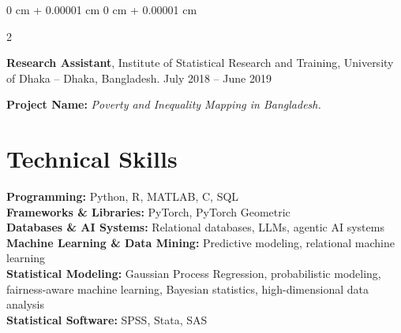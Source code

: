 \documentclass[10pt, letterpaper]{article}
\newenvironment{highlights}{
    \begin{itemize}[
        topsep=0.10 cm,
        parsep=0.10 cm,
        partopsep=0pt,
        itemsep=0pt,
        leftmargin=0 cm + 10pt
    ]
}{
    \end{itemize}
} %
\newenvironment{onecolentry}{
    \begin{adjustwidth}{
        0 cm + 0.00001 cm
    }{
        0 cm + 0.00001 cm
    }
}{
    \end{adjustwidth}
} %
\newenvironment{twocolentry}[2][]{
    \onecolentry
    \def\secondColumn{#2}
    \setcolumnwidth{\fill, 4.5 cm}
    \begin{paracol}{2}
}{
    \switchcolumn \raggedleft \secondColumn
    \end{paracol}
    \endonecolentry
} %
\begin{document}
    \begin{twocolentry}{
            July 2018 -- June 2019
        }
            \textbf{Research Assistant}, Institute of Statistical Research and Training, University of Dhaka -- Dhaka, Bangladesh.\end{twocolentry} 
            \textbf{Project Name:}
    \textit{Poverty and Inequality Mapping in Bangladesh.}\\
       


       \section*{Technical Skills}
    \noindent
    \textbf{Programming:} Python, R, MATLAB, C, SQL \\
    \textbf{Frameworks \& Libraries:} PyTorch, PyTorch Geometric \\
    \textbf{Databases \& AI Systems:} Relational databases, LLMs, agentic AI systems \\
    \textbf{Machine Learning \& Data Mining:} Predictive modeling, relational machine learning\\ %
    \textbf{Statistical Modeling:} Gaussian Process Regression, probabilistic modeling, fairness-aware machine learning, Bayesian statistics, high-dimensional data analysis \\
    \textbf{Statistical Software:} SPSS, Stata, SAS \\
\end{document}
